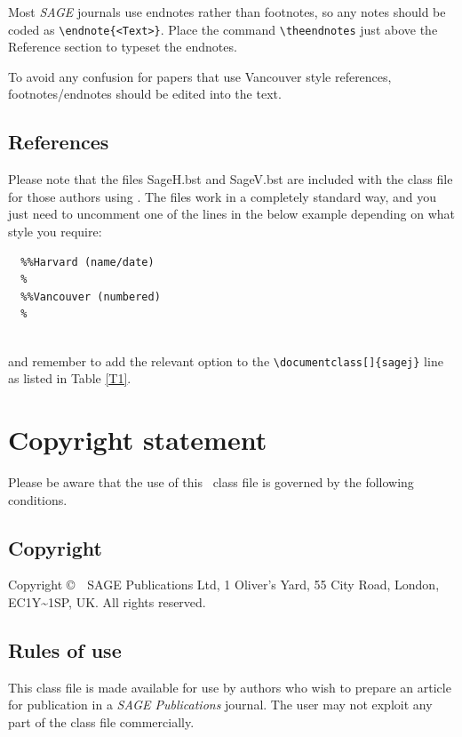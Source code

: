 \documentclass[Afour,sageh,times]{includes/tex/sagej}
\begin{document}
Most \textit{SAGE} journals use endnotes rather than footnotes, so any
notes should be coded as \verb+\endnote{<Text>}+. Place the command
\verb+\theendnotes+ just above the Reference section to typeset the
endnotes.

To avoid any confusion for papers that use Vancouver style references,
footnotes/endnotes should be edited into the text.

\subsection{References}

Please note that the files \textsf{SageH.bst} and \textsf{SageV.bst} are
included with the class file for those authors using \BibTeX. The files
work in a completely standard way, and you just need to uncomment one of
the lines in the below example depending on what style you require:

\begin{verbatim}
  %%Harvard (name/date)
  %
  %%Vancouver (numbered)
  %
  
\end{verbatim}

\noindent and remember to add the relevant option to the
\verb+\documentclass[]{sagej}+ line as listed in Table \ref{T1}.

\section{Copyright statement}

Please be aware that the use of this \LaTeXe~class file is governed by
the following conditions.

\subsection{Copyright}

Copyright \copyright~\volumeyear~SAGE Publications Ltd, 1 Oliver's Yard,
55 City Road, London, EC1Y\textasciitilde{}1SP, UK. All rights reserved.

\subsection{Rules of use}

This class file is made available for use by authors who wish to prepare
an article for publication in a \textit{SAGE Publications} journal. The
user may not exploit any part of the class file commercially.
\end{document}
